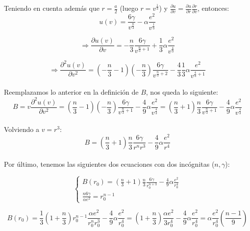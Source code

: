 \documentclass[a4paper]{article}
\begin{document}
Teniendo en cuenta adem\'as que $r = \frac{a}{2}$ (luego $r = v^{\frac{1}{3}}$) y $\frac{\partial u}{\partial v} = \frac{\partial u}{\partial r}\frac{\partial r}{\partial v}$, entonces:\\

$$ u(v) = \frac{6\gamma}{v^{\frac{n}{3}}} - \alpha \frac{e^{2}}{v^{\frac{1}{3}}}$$

$$ \Rightarrow \frac{\partial u(v)}{\partial v} = -\frac{n}{3}\frac{6\gamma}{v^{\frac{n}{3} + 1}} +\frac{1}{3} \alpha \frac{e^{2}}{v^{\frac{4}{3}}}$$

$$ \Rightarrow \frac{\partial^{2} u(v)}{\partial v^{2}} = \left(-\frac{n}{3}- 1\right)\left(-\frac{n}{3}\right)\frac{6\gamma}{v^{\frac{n}{3} + 2}} -\frac{4}{3}\frac{1}{3} \alpha \frac{e^{2}}{v^{\frac{4}{3} + 1}}$$\\

Reemplazamos lo anterior en la definici\'on de $B$, nos queda lo siguiente:\\

$$ B = v \frac{\partial^{2} u(v)}{\partial v^{2}} = \left(\frac{n}{3}- 1\right)\left(-\frac{n}{3}\right)\frac{6\gamma}{v^{\frac{n}{3} + 1}} -\frac{4}{9} \alpha \frac{e^{2}}{v^{\frac{4}{3}}} = \left(\frac{n}{3} + 1\right)\frac{n}{3}\frac{6\gamma}{v^{\frac{n}{3} + 1}} -\frac{4}{9} \alpha \frac{e^{2}}{v^{\frac{4}{3}}} $$\\

Volviendo a $ v = r^{3}$:\\

$$ B = \left(\frac{n}{3} + 1\right)\frac{n}{3}\frac{6\gamma}{r^{n}r^{3}} -\frac{4}{9} \alpha \frac{e^{2}}{r^{4}} $$\\

Por \'ultimo, tenemos las siguientes dos ecuaciones con dos inc\'ognitas ($n, \gamma$):

$$\begin{cases}
B(r_{0}) = \left(\frac{n}{3} + 1\right)\frac{n}{3}\frac{6\gamma}{r_{0}^{n + 3}} -\frac{4}{9} \alpha \frac{e^{2}}{r_{0}^{4}} \\
\frac{n6\gamma}{\alpha e^{2}} = r_{0}^{n-1}
\end{cases}$$

$$B(r_{0}) = \frac{1}{3}\left( 1 + \frac{n}{3}\right)r_{0}^{n-1} \frac{\alpha e^{2}}{r_{0}^{n}r_{0}^{3}} - \frac{4}{9}\alpha \frac{e^{2}}{r_{0}^{4}} = \left( 1 + \frac{n}{3}\right)\frac{\alpha e^{2}}{3r_{0}^{4}} - \frac{4}{9}\alpha \frac{e^{2}}{r_{0}^{4}} = \alpha \frac{e^{2}}{r_{0}^{4}} \left( \frac{n-1}{9}\right) $$
\end{document}
